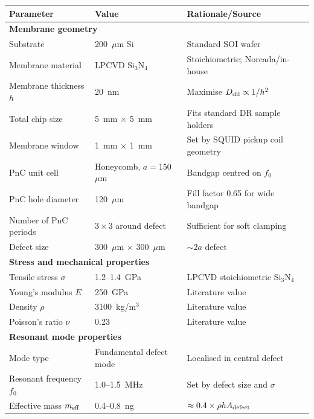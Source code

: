\documentclass[11pt]{article}
\theoremstyle{definition}
\theoremstyle{remark}
\begin{document}
\begin{tcolorbox}[colback=green!5!white, colframe=green!50!black,
  title=\textbf{DFD-OPTIMISED Si$_3$N$_4$ MEMS --- FABRICATION SPEC}]

\begin{center}
\renewcommand{\arraystretch}{1.4}
\begin{tabular}{p{4.5cm}p{3cm}p{5cm}}
\toprule
\textbf{Parameter} & \textbf{Value} & \textbf{Rationale/Source} \\
\midrule
\multicolumn{3}{l}{\textbf{Membrane geometry}} \\
\midrule
Substrate & 200~$\mu$m Si & Standard SOI wafer \\
Membrane material & LPCVD Si$_3$N$_4$ & Stoichiometric; Norcada/in-house \\
Membrane thickness $h$ & 20~nm & Maximise $D_{\rm dil} \propto 1/h^2$ \\
Total chip size & 5~mm $\times$ 5~mm & Fits standard DR sample holders \\
Membrane window & 1~mm $\times$ 1~mm & Set by SQUID pickup coil geometry \\
PnC unit cell & Honeycomb, $a = 150$~$\mu$m & Bandgap centred on $f_0$ \\
PnC hole diameter & 120~$\mu$m & Fill factor 0.65 for wide bandgap \\
Number of PnC periods & $3 \times 3$ around defect & Sufficient for soft clamping \\
Defect size & 300~$\mu$m $\times$ 300~$\mu$m & $\sim 2a$ defect \\
\midrule
\multicolumn{3}{l}{\textbf{Stress and mechanical properties}} \\
\midrule
Tensile stress $\sigma$ & 1.2--1.4~GPa & LPCVD stoichiometric Si$_3$N$_4$ \\
Young's modulus $E$ & 250~GPa & Literature value \\
Density $\rho$ & 3100~kg/m$^3$ & Literature value \\
Poisson's ratio $\nu$ & 0.23 & Literature value \\
\midrule
\multicolumn{3}{l}{\textbf{Resonant mode properties}} \\
\midrule
Mode type & Fundamental defect mode & Localised in central defect \\
Resonant frequency $f_0$ & 1.0--1.5~MHz & Set by defect size and $\sigma$ \\
Effective mass $m_{\rm eff}$ & 0.4--0.8~ng & $\approx 0.4 \times \rho h A_{\rm defect}$ \\

\end{tabular}
\end{center}
\end{tcolorbox}
\end{document}

